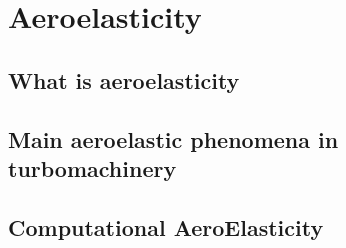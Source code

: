 \chapter{Aeroelasticity}
\label{cha:ael}

\chabstract{}

\minitoc
\newpage

\section{What is aeroelasticity}
\label{sec:what_is_ael}


\section{Main aeroelastic phenomena in turbomachinery}
\label{sec:ael_phenomena}


\section{Computational AeroElasticity}
\label{sec:cae}


\chconclu{}
